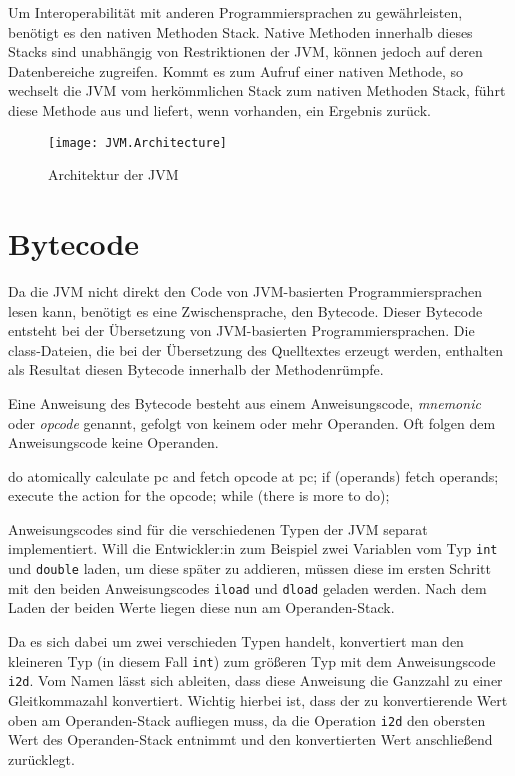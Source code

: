 Um Interoperabilität mit anderen Programmiersprachen zu gewährleisten, benötigt es den nativen Methoden Stack. Native Methoden innerhalb dieses Stacks sind unabhängig von Restriktionen der JVM, können jedoch auf deren Datenbereiche zugreifen. Kommt es zum Aufruf einer nativen Methode, so wechselt die JVM vom herkömmlichen Stack zum nativen Methoden Stack, führt diese Methode aus und liefert, wenn vorhanden, ein Ergebnis zurück.

\begin{figure}
    \caption{Architektur der JVM}
    \centering
    \texttt{[image: JVM.Architecture]}
    \label{fig:jvm-architecture}
\end{figure}

\section{Bytecode}

Da die JVM nicht direkt den Code von JVM-basierten Programmiersprachen lesen kann, benötigt es eine Zwischensprache, den Bytecode. Dieser Bytecode entsteht bei der Übersetzung von JVM-basierten Programmiersprachen. Die class-Dateien, die bei der Übersetzung des Quelltextes erzeugt werden, enthalten als Resultat diesen Bytecode innerhalb der Methodenrümpfe.

Eine Anweisung des Bytecode besteht aus einem Anweisungscode, \textit{mnemonic} oder \textit{opcode} genannt, gefolgt von keinem oder mehr Operanden. Oft folgen dem Anweisungscode keine Operanden.

\begin{JavaCode}[numbers=none, caption={Auszug aus der JVM Spezifikation, welche die Interpretationsschleife für Bytecode repräsentiert.}]
do {
    atomically calculate pc and fetch opcode at pc;
    if (operands) fetch operands;
    execute the action for the opcode;
} while (there is more to do);
\end{JavaCode}

Anweisungscodes sind für die verschiedenen Typen der JVM separat implementiert. Will die Entwickler:in zum Beispiel zwei Variablen vom Typ \texttt{int} und \texttt{double} laden, um diese später zu addieren, müssen diese im ersten Schritt mit den beiden Anweisungscodes \texttt{iload} und \texttt{dload} geladen werden. Nach dem Laden der beiden Werte liegen diese nun am Operanden-Stack. 

Da es sich dabei um zwei verschieden Typen handelt, konvertiert man den kleineren Typ (in diesem Fall \texttt{int}) zum größeren Typ mit dem Anweisungscode \texttt{i2d}. Vom Namen lässt sich ableiten, dass diese Anweisung die Ganzzahl zu einer Gleitkommazahl konvertiert. Wichtig hierbei ist, dass der zu konvertierende Wert oben am Operanden-Stack aufliegen muss, da die Operation \texttt{i2d} den obersten Wert des Operanden-Stack entnimmt und den konvertierten Wert anschließend zurücklegt.

